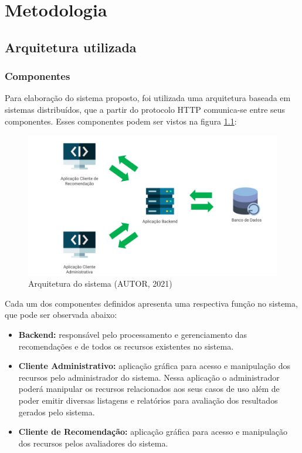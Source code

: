 

\setlength{\afterchapskip}{1.5cm minus \baselineskip}


\chapter{Metodologia}
\label{cha:metodologia}

\section{Arquitetura utilizada}

\subsection{Componentes}

Para elaboração do sistema proposto, foi utilizada uma arquitetura baseada em sistemas distribuídos, que a partir do protocolo HTTP comunica-se entre seus componentes. Esses componentes podem ser vistos na figura \ref{fig:arquitetura}:

\begin{figure}[H]
	\centering
	\includegraphics[width=0.7\linewidth]{imagens/arquitetura.png}
	\caption[Arquitetura do sistema]{Arquitetura do sistema (AUTOR, 2021)}
    \label{fig:arquitetura}
\end{figure}

Cada um dos componentes definidos apresenta uma respectiva função no sistema, que pode ser observada abaixo:

\begin{itemize}
    \item \textbf{Backend:} responsável pelo processamento e gerenciamento das recomendações e de todos os recursos existentes no sistema.
    
    \item \textbf{Cliente Administrativo:} aplicação gráfica para acesso e manipulação dos recursos pelo administrador do sistema. Nessa aplicação o administrador poderá manipular os recursos relacionados aos seus casos de uso além de poder emitir diversas listagens e relatórios para avaliação dos resultados gerados pelo sistema.
    
    \item \textbf{Cliente de Recomendação:} aplicação gráfica para acesso e manipulação dos recursos pelos avaliadores do sistema.
\end{itemize}

